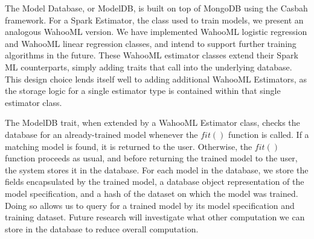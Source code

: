 \documentclass[../proposal.tex]{subfiles}
\begin{document}
The Model Database, or ModelDB, is built on top of MongoDB using the Casbah
framework. For a Spark Estimator, the class used to train models, we present an
analogous WahooML version. We have implemented WahooML logistic regression and
WahooML linear regression classes, and intend to support further training
algorithms in the future. These WahooML estimator classes extend their
Spark ML counterparts, simply adding traits that call into the underlying
database. This design choice lends itself well to adding additional WahooML
Estimators, as the storage logic for a single estimator type is contained
within that single estimator class. 

The ModelDB trait, when extended by a WahooML Estimator class, checks the
database for an already-trained model whenever the $fit()$ function is called.
If a matching model is found, it is returned to the user. Otherwise, the
$fit()$ function proceeds as usual, and before returning the trained model to
the user, the system stores it in the database. For each model in the database,
we store the fields encapsulated by the trained model, a database object
representation of the model specification, and a hash of the dataset on which
the model was trained. Doing so allows us to query for a trained model by its
model specification and training dataset. Future research will investigate what
other computation we can store in the database to reduce overall computation.
\end{document}
